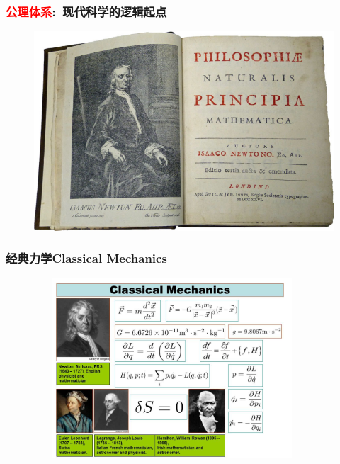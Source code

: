 {
	\frametitle{\textcolor{red}{公理体系}:~现代科学的逻辑起点}
\begin{figure}[h!]
\centering
\vspace{-10.5pt}
\includegraphics[height=0.68\textwidth,width=1.0\textwidth,viewport=0 0 770 500,clip]{Figures/Philp_Nature_Mach-2.png}
\label{Philp_Nature}
\end{figure}
}

\frame
{
	\frametitle{经典力学\textrm{Classical Mechanics}}
\begin{figure}[h!]
\vspace*{-0.18in}
\centering
\includegraphics[height=2.65in,width=4.05in,viewport=0 0 715 495,clip]{Figures/Classical_Mechanics.jpg}
\label{Classical_Mechanics}
\end{figure}
}


